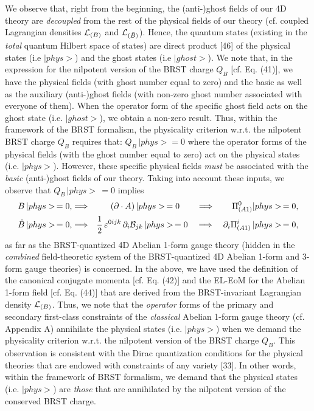 \documentclass[12pt]{article}
\begin{document}
We observe that, right from the beginning, the (anti-)ghost fields of our 4D theory are {\it decoupled} from the rest of the 
physical fields of our theory (cf. coupled Lagrangian densities  ${\cal L}_{(B)}$ and  ${\cal L}_{(\bar B)}$). Hence, the 
quantum states (existing in the {\it total} quantum Hilbert space of states) are direct product [46] of the physical states (i.e $|phys>$) and the ghost states
(i.e $|ghost>$). We note that, in the expression for the nilpotent version of the BRST charge $Q_B$ [cf. Eq. (41)], we have the physical fields (with ghost number
equal to zero) and the basic as well as the auxiliary (anti-)ghost fields (with non-zero ghost number associated with everyone of them). When
the operator form of the specific ghost field acts on the ghost state (i.e.  $|ghost>$), we obtain a non-zero result. Thus, within the framework 
of the BRST formalism, the physicality criterion w.r.t. the nilpotent BRST charge $Q_B$ requires that: $Q_B \, |phys> = 0$ where the operator forms of the
physical fields (with the ghost number equal to zero) act on the physical states (i.e. $|phys>$). However, these 
specific physical fields {\it must} be associated
with the {\it basic} (anti-)ghost fields of our theory. Taking into account these inputs,
we observe that  $Q_B \, |phys> \,= 0$ implies 
\begin{eqnarray}\label{45}
B \, |phys> \,= 0, &\Longrightarrow& (\partial \cdot A) \,|phys>\, = 0 \qquad \Longrightarrow \qquad \Pi^{0}_{(A1)} |phys>\, = 0, \nonumber\\
\dot B \, |phys> \, = 0, &\Longrightarrow& \dfrac{1}{2}\, \varepsilon^{0ijk}\, \partial_i {\cal B}_{jk} \,|phys>\, = 0 \quad  \Longrightarrow \quad 
\partial_i \Pi^i_{(A1)} \, |phys>\, = 0,
\end{eqnarray}
as far as the BRST-quantized 4D Abelian 1-form gauge theory (hidden in the {\it combined} 
field-theoretic system of the BRST-quantized 4D Abelian 1-form and 3-form gauge theories) is concerned. In the above, we have used the definition of the canonical conjugate momenta [cf. Eq. (42)] and the EL-EoM for the Abelian 1-form field 
[cf. Eq. (44)] that are derived from the BRST-invariant Lagrangian density ${\cal L}_{(B)}$. Thus, we note that the 
{\it operator} forms of the primary and secondary first-class constraints of the {\it classical}  Abelian 1-form gauge theory (cf. Appendix A) annihilate
the physical states (i.e. $|phys>$) when we demand the physicality criterion w.r.t. the nilpotent version of the BRST charge $Q_B$. This observation is consistent
with the Dirac quantization conditions for the physical theories that are endowed with constraints of any variety [33]. In other words, within the framework of BRST 
formalism, we demand that the physical states (i.e. $|phys>$)
are {\it those} that are annihilated by the nilpotent version of the conserved BRST charge.
\end{document}
